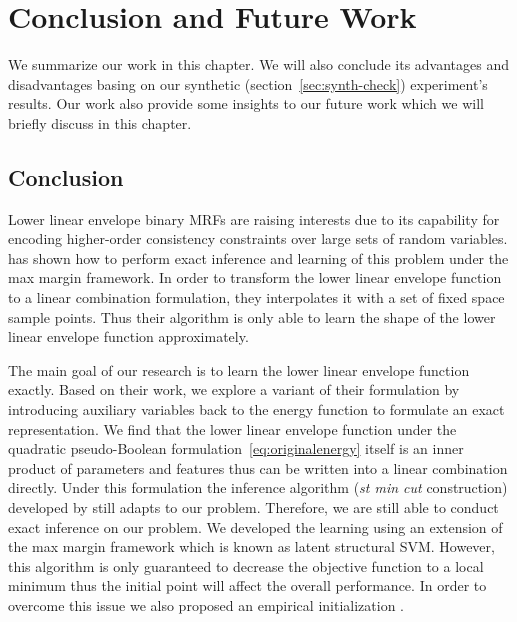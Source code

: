 
\chapter{Conclusion and Future Work}
\label{cha:conclusion}

We summarize our work in this chapter. We will also conclude its
advantages and disadvantages basing on our synthetic
(section~\ref{sec:synth-check}) experiment's results. Our work
also provide some insights to our future work which we will
briefly discuss in this chapter.


\section{Conclusion}
\label{sec:conclusion}

Lower linear envelope binary MRFs are raising interests due to
its capability for encoding higher-order consistency constraints
over large sets of random variables.  has
shown how to perform exact inference and learning of this problem
under the max margin framework. In order to transform the lower
linear envelope function to a linear combination formulation,
they interpolates it with a set of fixed space sample points.
Thus their algorithm is only able to learn the shape of the lower
linear envelope function approximately.

The main goal of our research is to learn the lower linear
envelope function exactly. Based on their work, we explore a
variant of their formulation by introducing auxiliary variables
back to the energy function to formulate an exact representation.
We find that the lower linear envelope function under the
quadratic pseudo-Boolean formulation~\eqref{eq:originalenergy}
itself is an inner product of parameters and features thus can be
written into a linear combination directly. Under this
formulation the inference algorithm (\emph{st min cut}
construction) developed by  still adapts
to our problem. Therefore, we are still able to conduct exact
inference on our problem. We developed the learning
 using an extension of the max margin
framework which is known as latent structural SVM. However, this
algorithm is only guaranteed to decrease the objective function
to a local minimum thus the initial point will affect the overall
performance. In order to overcome this issue we also proposed an
empirical initialization .


